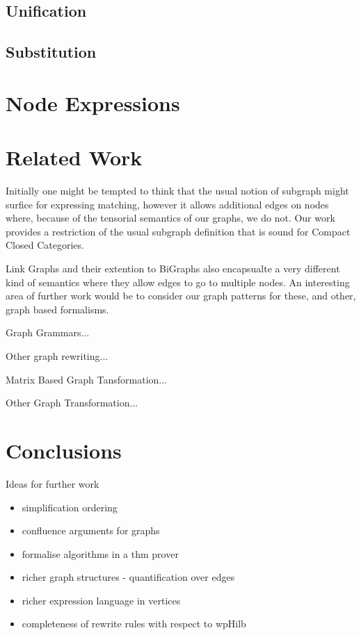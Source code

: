 \documentclass[runningheads]{llncs}
\begin{document}
\subsection{Unification}
\subsection{Substitution}


\section{Node Expressions}
\label{sec:node-expressions}


\section{Related Work}
\label{sec:relatedwork}

Initially one might be tempted to think that the usual notion of
subgraph might surfice for expressing matching, however it allows
additional edges on nodes where, because of the tensorial semantics of
our graphs, we do not. Our work provides a restriction of the usual
subgraph definition that is sound for Compact Closed Categories.

Link Graphs and their extention to BiGraphs also encapsualte a very
different kind of semantics where they allow edges to go to multiple
nodes. An interesting area of further work would be to consider our
graph patterns for these, and other, graph based formalisms.

Graph Grammars...

Other graph rewriting... 

Matrix Based Graph Tansformation...

Other Graph Transformation...

\section{Conclusions}
\label{sec:conclusions}

Ideas for further work
\begin{itemize}
\item simplification ordering
\item confluence arguments for graphs
\item formalise algorithms in a thm prover
\item richer graph structures - quantification over edges
\item richer expression language in vertices
\item completeness of rewrite rules with respect to wpHilb
\end{itemize}




\end{document}
